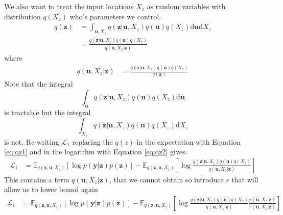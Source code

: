 \documentclass[12pt]{article}
\newcommand{\ub}{\mathbf{u}}
\newcommand{\zb}{\mathbf{z}}
\newcommand{\yb}{\mathbf{y}}
\newcommand{\dd}{\mathrm{d}}
\newcommand{\Lo}{\mathcal{L}_1}
\newcommand{\Ex}{\mathbb{E}}
\begin{document}
We also want to treat the input locations $X_z$ as random variables with distribution $q(X_z)$ who's parameters we control.
%
\begin{align}
q(\zb) &= \int_{\ub,X_z} q(\zb|\ub,X_z)q(\ub)q(X_z) \dd\ub \dd X_z \label{eq:qz1} \\
&= \frac{q(\zb|\ub,X_z)q(\ub)q(X_z)}{q(\ub,X_z|\zb)} \label{eq:qz2}
\end{align}
%
where
\begin{align}
q(\ub,X_z|\zb) &= \frac{q(\zb|\ub,X_z)q(\ub)q(X_z)}{q(\zb)}
\end{align}
%
Note that the integral
%
\begin{equation}
\int_{\ub} q(\zb|\ub,X_z)q(\ub)q(X_z) \dd\ub
\end{equation}
%
is tractable but the integral
\begin{equation}
\int_{X_z} q(\zb|\ub,X_z)q(\ub)q(X_z) \dd X_z
\end{equation}
%
is not.
%
Re-writing $\Lo$ replacing the $q(z)$ in the expectation with Equation \ref{eq:qz1} and in the logarithm with Equation \ref{eq:qz2} gives.
%
\begin{align}
\Lo &= \Ex_{q(\zb,\ub,X_z)}[\log p(\yb|\zb)p(\zb)] - \Ex_{q(\zb,\ub,X_z)}\left[\log\frac{q(\zb|\ub,X_z)q(\ub)q(X_z)}{q(\ub,X_z|\zb)}\right]
\end{align}
%
This contains a term $q(\ub,X_z|\zb)$, that we cannot obtain so introduce $r$ that will allow us to lower bound again
%
\begin{align}
\Lo &= \Ex_{q(\zb,\ub,X_z)}[\log p(\yb|\zb)p(\zb)] - \Ex_{q(\zb,\ub,X_z)}\left[\log\frac{q(\zb|\ub,X_z)q(\ub)q(X_z)}{q(\ub,X_z|\zb)}\frac{r(\ub,X_z|\zb)}{r(\ub,X_z|\zb)}\right]
\end{align}
\end{document}
